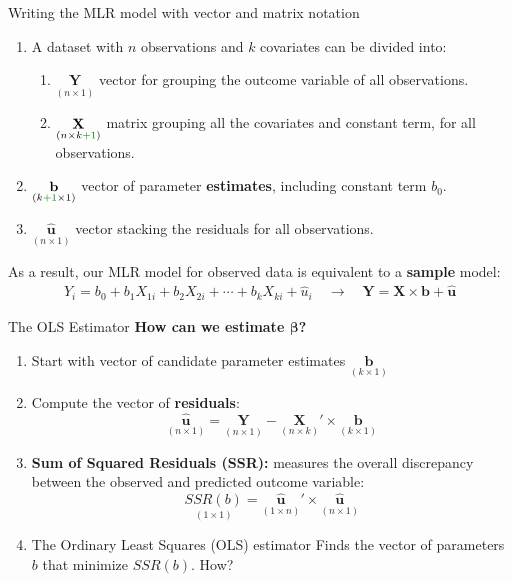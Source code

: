 \documentclass[9pt,aspectratio=169]{beamer}
\begin{document}
\begin{frame}[fragile]{Writing the MLR model with vector and matrix notation}
    \begin{enumerate}
        \item A dataset with $n$ observations and $k$ covariates can be divided into:
        \begin{enumerate}
            \item $\underset{(n \times 1)}{\textbf{Y}}$ vector for grouping the outcome variable of all observations.  
            \item $\underset{(n \times k\textcolor{green!50!black}{+1})}{\textbf{X}}$ matrix grouping all the covariates and \textcolor{green!50!black}{constant term}, for all observations.
        \end{enumerate}
        \pause
        \item $\underset{(k\textcolor{green!50!black}{+1} \times 1)}{\textbf{b}}$ vector of parameter \textbf{estimates}, \textcolor{green!50!black}{including constant term $b_0$}.
        \pause
        \item $\underset{(n \times 1)}{\hat{\mathbf{u}}}$ vector stacking the residuals for all observations.
    \end{enumerate}
    \pause
    As a result, our MLR model for observed data is equivalent to a \textbf{sample} model:
    \begin{align*}
    Y_i = b_0 + b_1 X_{1i} + b_2 X_{2i} + \cdots + b_k X_{ki} + \hat{u}_i \quad \rightarrow \quad
    \textbf{Y} = \textbf{X} \times \textbf{b} + \hat{\mathbf{u}}
    \end{align*}
\end{frame}

\begin{frame}{The OLS Estimator}
\textbf{How can we estimate $\boldsymbol{\beta}$?}
\\
\pause
\begin{enumerate}
    \item Start with vector of candidate parameter estimates $\underset{(k \times 1)}{\textbf{b}}$
    \pause
    \item Compute the vector of \textbf{residuals}: 
    $$
    \underset{(n \times 1)}{\hat{\mathbf{u}}} = \underset{(n \times 1)}{\textbf{Y}} - \underset{(n \times k)}{\textbf{X}} ' \times \underset{(k \times 1)}{\textbf{b}}
    $$ \pause
    \item \textbf{Sum of Squared Residuals (SSR):} measures the overall discrepancy between the observed and predicted outcome variable:
    $$
    \underset{(1 \times 1)}{SSR(b)} = \underset{(1 \times n)}{\hat{\mathbf{u}}} ' \times \underset{(n \times 1)}{\hat{\mathbf{u}}}
    $$ \pause
    \item The Ordinary Least Squares (OLS) estimator Finds the vector of parameters $b$ that minimize $SSR(b)$. How?
\end{enumerate}
\end{frame}
\end{document}
